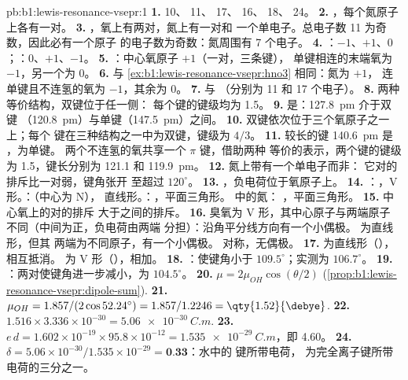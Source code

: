 \begin{solution}{pb:b1:lewis-resonance-vsepr:1}
\textbf{1.}  10、 11、 17、 16、 18、
 24。
\textbf{2.} ，每个氮原子上各有一对。
\textbf{3.} ，氧上有两对，氮上有一对和
一个单电子。总电子数 11 为奇数，因此必有一个原子
的电子数为奇数：氮周围有 7 个电子。
\textbf{4.} ：$-1$、$+1$、$0$；：$0$、$+1$、$-1$。
\textbf{5.} ：中心氧原子 $+1$（一对，三条键），
单键相连的末端氧为 $-1$，另一个为 0。
\textbf{6.} 与 \cref{ex:b1:lewis-resonance-vsepr:hno3} 相同：氮为 $+1$，
连单键且不连氢的氧为 $-1$，其余为 0。
\textbf{7.}  与 （分别为 11 和 17 个电子）。
\textbf{8.} 两种等价结构，双键位于任一侧：
每个键的键级均为 1.5。
\textbf{9.} 是：\qty{127.8}{pm} 介于双键
（\qty{120.8}{pm}）与单键（\qty{147.5}{pm}）之间。
\textbf{10.} 双键依次位于三个氧原子之一上；每个
 键在三种结构之一中为双键，键级为 $4/3$。
\textbf{11.} 较长的键 \qty{140.6}{pm} 是 ，为单键。
两个不连氢的氧共享一个 $\pi$ 键，借助两种
等价的表示，两个键的键级为 1.5，键长分别为 121.1 和
\qty{119.9}{pm}。
\textbf{12.} 氮上带有一个单电子而非：
它对的排斥比一对弱，键角张开
至超过 $120^\circ$。
\textbf{13.} ，负电荷位于氧原子上。
\textbf{14.} ：，V 形。：（中心为 N），
直线形。：，平面三角形。 中的氮：
，平面三角形。
\textbf{15.} 中心氧上的对的排斥
大于之间的排斥。
\textbf{16.} 臭氧为 V 形，其中心原子与两端原子
不同（中间为正，负电荷由两端
分担）：沿角平分线方向有一个小偶极。 为直线形，但其
两端为不同原子，有一个小偶极。 对称，无偶极。
\textbf{17.}  为直线形（），相互抵消。
 为 V 形（），相加。
\textbf{18.} ：使键角小于
$109.5^\circ$；实测为 $106.7^\circ$。
\textbf{19.} ：两对使键角进一步减小，为 $104.5^\circ$。
\textbf{20.} $\mu = 2\mu_{OH}\cos(\theta/2)$
(\cref{prop:b1:lewis-resonance-vsepr:dipole-sum}).
\textbf{21.} $\mu_{OH} = 1.857/(2\cos 52.24^\circ) = 1.857/1.2246 =
\qty{1.52}{\debye}$.
\textbf{22.} $1.516 \times 3.336 \times 10^{-30} = \qty{5.06e-30}{C.m}$.
\textbf{23.} $e\,d = 1.602 \times 10^{-19} \times 95.8 \times 10^{-12} =
\qty{1.535e-29}{C.m}$，即 \qty{4.60}{\debye}。
\textbf{24.} $\delta = 5.06 \times 10^{-30}/1.535 \times 10^{-29} =
\textbf{0.33}$：水中的  键所带电荷，
为完全离子键所带电荷的三分之一。
\end{solution}
